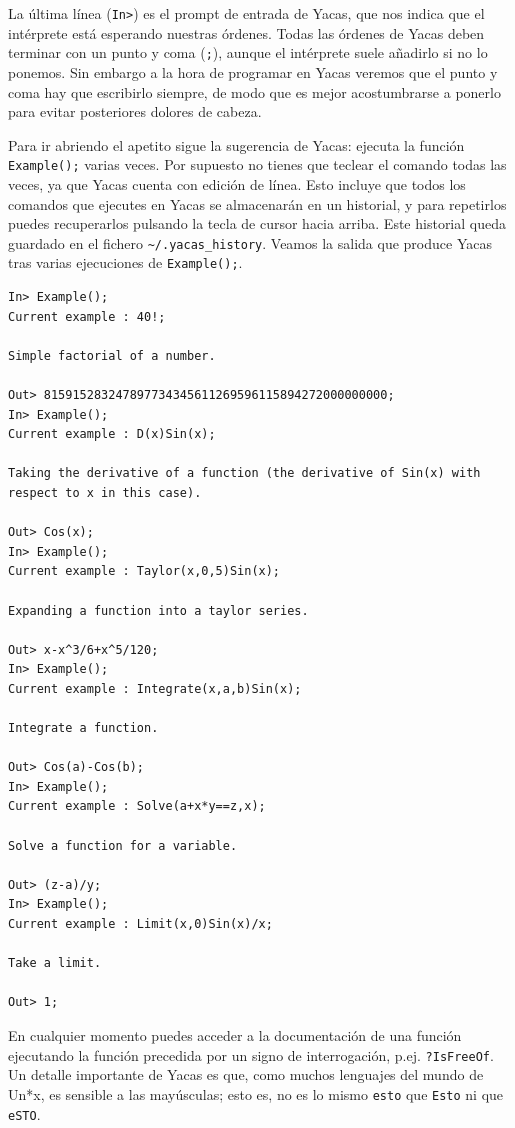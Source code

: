 La última línea (\verb+In>+) es el prompt de entrada de Yacas, que nos
indica que  el intérprete está  esperando nuestras órdenes.  Todas las
órdenes de Yacas deben terminar con un punto y coma (\verb+;+), aunque
el intérprete suele  añadirlo si no lo ponemos. Sin  embargo a la hora
de programar en  Yacas veremos que el punto y  coma hay que escribirlo
siempre,  de modo  que es  mejor acostumbrarse  a ponerlo  para evitar
posteriores dolores de cabeza.

Para ir abriendo  el apetito sigue la sugerencia de  Yacas: ejecuta la
función  \verb+Example();+ varias  veces. Por  supuesto no  tienes que
teclear el comando todas las veces, ya que Yacas cuenta con edición de
línea. Esto  incluye que todos los  comandos que ejecutes en  Yacas se
almacenarán  en un  historial, y  para repetirlos  puedes recuperarlos
pulsando  la  tecla  de  cursor hacia  arriba.  Este  historial  queda
guardado en  el fichero \verb+~/.yacas_history+. Veamos  la salida que
produce Yacas tras varias ejecuciones de \verb+Example();+.

\begin{verbatim}
In> Example();
Current example : 40!;

Simple factorial of a number.

Out> 815915283247897734345611269596115894272000000000;
In> Example();
Current example : D(x)Sin(x);

Taking the derivative of a function (the derivative of Sin(x) with
respect to x in this case).

Out> Cos(x);
In> Example();
Current example : Taylor(x,0,5)Sin(x);

Expanding a function into a taylor series.

Out> x-x^3/6+x^5/120;
In> Example();
Current example : Integrate(x,a,b)Sin(x);

Integrate a function.

Out> Cos(a)-Cos(b);
In> Example();
Current example : Solve(a+x*y==z,x);

Solve a function for a variable.

Out> (z-a)/y;
In> Example();
Current example : Limit(x,0)Sin(x)/x;

Take a limit.

Out> 1;
\end{verbatim}

En cualquier momento puedes acceder  a la documentación de una función
ejecutando la función  precedida por un signo  de interrogación, p.ej.
\verb+?IsFreeOf+. Un detalle  importante de Yacas es  que, como muchos
lenguajes del mundo de Un*x, es sensible a las mayúsculas; esto es, no
es lo mismo \verb+esto+ que \verb+Esto+ ni que \verb+eSTO+.

